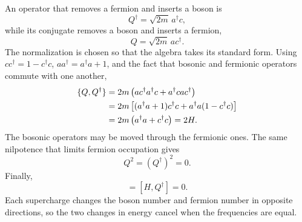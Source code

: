 An operator that removes a fermion and inserts a boson is
\begin{equation}
Q^\dagger=\sqrt{2m}\,a^\dagger c,
\end{equation}
while its conjugate removes a boson and inserts a fermion,
\begin{equation}
Q=\sqrt{2m}\,a c^\dagger.
\end{equation}
The normalization is chosen so that the algebra takes its standard form. Using \(cc^\dagger=1-c^\dagger c\), \(aa^\dagger=a^\dagger a+1\), and the fact that bosonic and fermionic operators commute with one another,
\begin{align}
\{Q,Q^\dagger\}
&=2m\left(ac^\dagger a^\dagger c+a^\dagger c a c^\dagger\right)\notag\\
&=2m\left[(a^\dagger a+1)c^\dagger c
+a^\dagger a(1-c^\dagger c)\right]\notag\\
&=2m\left(a^\dagger a+c^\dagger c\right)=2H.
\label{eq:l7-superalgebra}
\end{align}
The bosonic operators may be moved through the fermionic ones. The same nilpotence that limits fermion occupation gives
\begin{equation}
Q^2=(Q^\dagger)^2=0.
\end{equation}
Finally,
\begin{equation}
[H,Q]=[H,Q^\dagger]=0.
\label{eq:l7-conserved-supercharges}
\end{equation}
Each supercharge changes the boson number and fermion number in opposite directions, so the two changes in energy cancel when the frequencies are equal.

\begin{classroomqa}
\end{classroomqa}

\begin{classroomqa}
\end{classroomqa}

